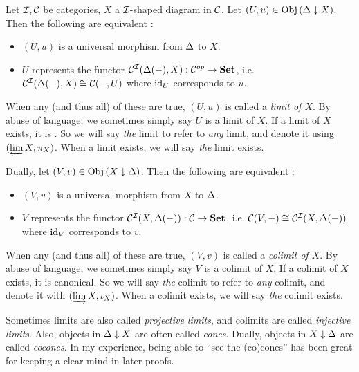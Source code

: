 \begin{dfn}
  
  Let $\mathcal{I}, \mathcal{C}$ be categories, $X$ a $\mathcal{I}$-shaped diagram in $\mathcal{C}$.
  Let $(U,u) \in \mathrm{Obj}\left(\Delta\downarrow X\right)$. 
  Then the following are equivalent : 
  \begin{itemize}
    \item $(U,u)$ is a universal morphism from $\Delta$ to $X$.
    \item $U$ represents the functor $\mathcal{C}^{\mathcal{I}}(\Delta(-),X) : \mathcal{C}^{op} \to \mathbf{Set}$,
    i.e. $\mathcal{C}^{\mathcal{I}}(\Delta(-),X) \cong \mathcal{C}(-,U)$ where $\mathrm{id}_{U}$ corresponds to $u$.
  \end{itemize}
  When any (and thus all) of these are true,
  $(U,u)$ is called a \emph{limit of $X$}.
  By abuse of language, we sometimes simply say $U$ is a limit of $X$.
  If a limit of $X$ exists, 
  it is .
  So we will say \emph{the} limit to refer to \emph{any} limit,
  and denote it using $(\varprojlim X, \pi_X)$.
  When a limit exists, we will say \emph{the} limit exists.
  
  Dually, let $(V,v) \in \mathrm{Obj}\left(X\downarrow \Delta\right)$.
  Then the following are equivalent : 
  \begin{itemize}
    \item $(V,v)$ is a universal morphism from $X$ to $\Delta$.
    \item $V$ represents the functor $\mathcal{C}^{\mathcal{I}}(X,\Delta(-)) : \mathcal{C} \to \mathbf{Set}$,
    i.e. $\mathcal{C}(V,-) \cong \mathcal{C}^{\mathcal{I}}(X,\Delta(-))$ where $\mathrm{id}_{V}$ corresponds to $v$.
  \end{itemize}
  When any (and thus all) of these are true,
  $(V,v)$ is called a \emph{colimit of $X$}.
  By abuse of language, we sometimes simply say $V$ is a colimit of $X$.
  If a colimit of $X$ exists, it is canonical.
  So we will say \emph{the} colimit to refer to \emph{any} colimit,
  and denote it with $(\varinjlim X, \iota_X)$.
  When a colimit exists, we will say \emph{the} colimit exists.
\end{dfn}

\begin{rmk}
  Sometimes limits are also called \emph{projective limits},
  and colimits are called \emph{injective limits}. 
  Also, objects in $\Delta\downarrow X$ are often called \emph{cones}.
  Dually, objects in $X\downarrow\Delta$ are called \emph{cocones}.
  In my experience,
  being able to ``see the (co)cones'' has been great
  for keeping a clear mind in later proofs.
\end{rmk}

